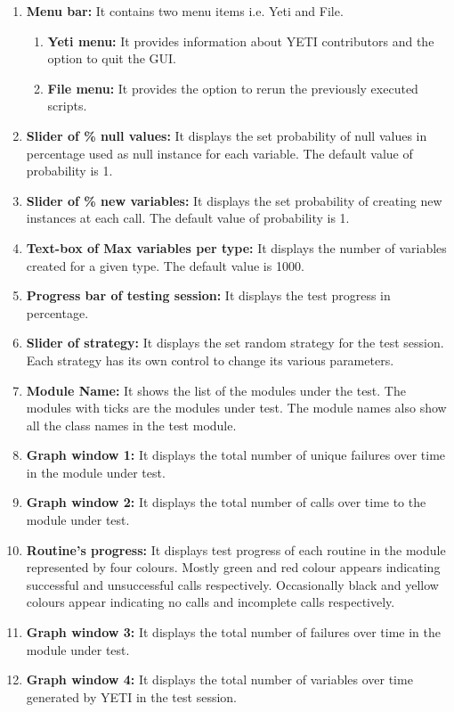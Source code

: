 \begin{enumerate}

\item \textbf{Menu bar:} It contains two menu items i.e. Yeti and File.
\begin{enumerate}
\item \textbf{Yeti menu:} It provides information about YETI contributors and the option to quit the GUI.
\item \textbf{File menu:} It provides the option to rerun the previously executed scripts.
\end{enumerate}
\item \textbf{Slider of \% null values:} It displays the set probability of null values in percentage used as null instance for each variable. The default value of probability is 1. 
\item \textbf{Slider of \% new variables:} It displays the set probability of creating new instances at each call. The default value of probability is 1. 
\item \textbf{Text-box of Max variables per type:} It displays the number of variables created for a given type. The default value is 1000.
\item \textbf{Progress bar of testing session:} It displays the test progress in percentage.
\item \textbf{Slider of strategy:} It displays the set random strategy for the test session. Each strategy has its own control to change its various parameters. 
\item \textbf{Module Name:} It shows the list of the modules under the test. The
modules with ticks are the modules under test. The module names also show all the
class names in the test module.
\item \textbf{Graph window 1:} It displays the total number of unique failures over time in the module under test.
\item \textbf{Graph window 2:} It displays the total number of calls over time to the module under test.
\item \textbf{Routine's progress:} It displays test progress of each routine in the module represented by four colours. Mostly green and red colour appears indicating successful and unsuccessful calls respectively. Occasionally black and yellow colours appear indicating no calls and incomplete calls respectively.
\item \textbf{Graph window 3:} It displays the total number of failures over time in the module under test. 
\item \textbf{Graph window 4:} It displays the total number of variables over time generated by YETI in the test session.

\end{enumerate}
